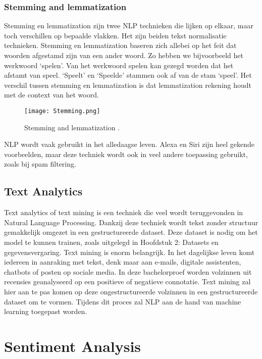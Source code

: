 \subsubsection{Stemming and lemmatization}
\label{sec:stemming}

Stemming en lemmatization zijn twee NLP technieken die lijken op elkaar, maar toch verschillen op bepaalde vlakken. Het zijn beiden tekst normalisatie technieken. Stemming en lemmatization baseren zich allebei op het feit dat woorden afgestamd zijn van een ander woord. Zo hebben we bijvoorbeeld het werkwoord ‘spelen’. Van het werkwoord spelen kan gezegd worden dat het afstamt van speel. ‘Speelt’ en ‘Speelde’ stammen ook af van de stam ‘speel’. Het verschil tussen stemming en lemmatization is dat lemmatization rekening houdt met de context van het woord. \autocite{sas2020}

\begin{figure}[!htbp]
    \texttt{[image: Stemming.png]}
    \caption{\label{stemming}Stemming and lemmatization \autocite{sas2020}.}
\end{figure}
\FloatBarrier

NLP wordt vaak gebruikt in het alledaagse leven. Alexa en Siri zijn heel gekende voorbeelden, maar deze techniek wordt ook in veel andere toepassing gebruikt, zoals bij spam filtering. 

\subsection{Text Analytics}
\label{sec:textanalytics}

Text analytics of text mining is een techniek die veel wordt teruggevonden in Natural Language Processing. Dankzij deze techniek wordt tekst zonder structuur gemakkelijk omgezet in een gestructureerde dataset. \autocite{Linguamatics2021} Deze dataset is nodig om het model te kunnen trainen, zoals uitgelegd in Hoofdstuk 2: Datasets en gegevensvergaring.
Text mining is enorm belangrijk. In het dagelijkse leven komt iedereen in aanraking met tekst, denk maar aan e-mails, digitale assistenten, chatbots of posten op sociale media. In deze bachelorproef worden volzinnen uit recensies geanalyseerd op een positieve of negatieve connotatie. Text mining zal hier aan te pas komen op deze ongestructureerde volzinnen in een gestructureerde dataset om te vormen. Tijdens dit proces zal NLP aan de hand van machine learning toegepast worden. 

\section{Sentiment Analysis}
\label{sec:sentimentanalysis}

